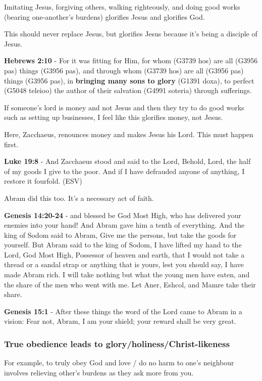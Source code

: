 \documentclass[11pt]{article}
\begin{document}
Imitating Jesus, forgiving others, walking righteously, and doing good works (bearing one-another's burdens) glorifies Jesus and glorifies God.

This should never replace Jesus, but glorifies Jesus because it's being a disciple of Jesus.

\textbf{Hebrews 2:10} - For it was fitting for Him, for whom (G3739 hos) are all (G3956 pas) things (G3956 pas), and through whom (G3739 hos) are all (G3956 pas) things (G3956 pas), in \textbf{bringing many sons to glory} (G1391 doxa), to perfect (G5048 teleioo) the author of their salvation (G4991 soteria) through sufferings.

If someone's lord is money and not Jesus and then they try to do good works such as setting up businesses, I feel like this glorifies money, not Jesus.

Here, Zacchaeus, renounces money and makes Jesus his Lord. This must happen first.

\textbf{Luke 19:8} - And Zacchaeus stood and said to the Lord, Behold, Lord, the half of my goods I give to the poor. And if I have defrauded anyone of anything, I restore it fourfold. (ESV)

Abram did this too. It's a necessary act of faith.

\textbf{Genesis 14:20-24} - and blessed be God Most High, who has delivered your enemies into your hand! And Abram gave him a tenth of everything. And the king of Sodom said to Abram, Give me the persons, but take the goods for yourself. But Abram said to the king of Sodom, I have lifted my hand to the Lord, God Most High, Possessor of heaven and earth, that I would not take a thread or a sandal strap or anything that is yours, lest you should say, I have made Abram rich. I will take nothing but what the young men have eaten, and the share of the men who went with me. Let Aner, Eshcol, and Mamre take their share.

\textbf{Genesis 15:1} - After these things the word of the Lord came to Abram in a vision: Fear not, Abram, I am your shield; your reward shall be very great.

\subsubsection{True obedience leads to glory/holiness/Christ-likeness}
\label{sec:org390a88c}
For example, to truly obey God and love / do no harm to one's neighbour involves relieving other's burdens as they ask more from you.
\end{document}
